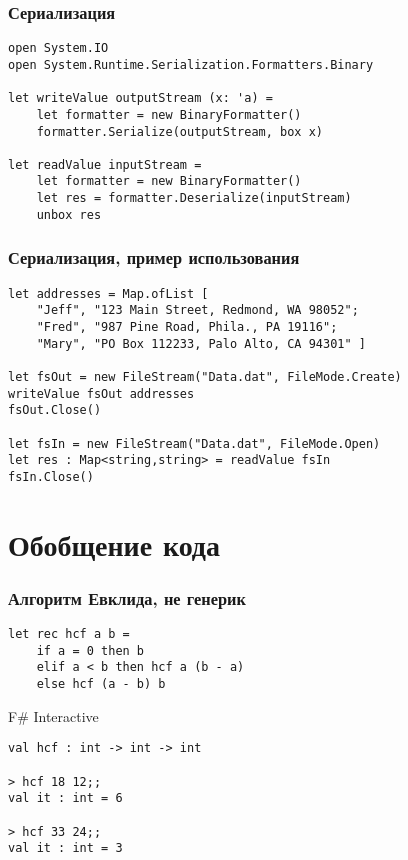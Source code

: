 \documentclass[xetex,mathserif,serif]{beamer}
\begin{document}
    \begin{frame}[fragile]
        \frametitle{Сериализация}
        \begin{verbatim}
open System.IO
open System.Runtime.Serialization.Formatters.Binary

let writeValue outputStream (x: 'a) =
    let formatter = new BinaryFormatter()
    formatter.Serialize(outputStream, box x)

let readValue inputStream =
    let formatter = new BinaryFormatter()
    let res = formatter.Deserialize(inputStream)
    unbox res
        \end{verbatim}
    \end{frame}

    \begin{frame}[fragile]
        \frametitle{Сериализация, пример использования}
        \begin{verbatim}
let addresses = Map.ofList [ 
    "Jeff", "123 Main Street, Redmond, WA 98052";
    "Fred", "987 Pine Road, Phila., PA 19116";
    "Mary", "PO Box 112233, Palo Alto, CA 94301" ]

let fsOut = new FileStream("Data.dat", FileMode.Create)
writeValue fsOut addresses
fsOut.Close()

let fsIn = new FileStream("Data.dat", FileMode.Open)
let res : Map<string,string> = readValue fsIn
fsIn.Close()
        \end{verbatim}
    \end{frame}

    \section{Обобщение кода}

    \begin{frame}[fragile]
        \frametitle{Алгоритм Евклида, не генерик}
        \begin{verbatim}
let rec hcf a b =
    if a = 0 then b
    elif a < b then hcf a (b - a)
    else hcf (a - b) b
        \end{verbatim}

        \begin{alertblock}{F\# Interactive}
            \begin{verbatim}
val hcf : int -> int -> int

> hcf 18 12;;
val it : int = 6

> hcf 33 24;;
val it : int = 3
            \end{verbatim}
        \end{alertblock}
    \end{frame}
\end{document}
